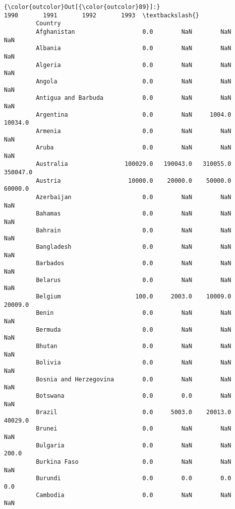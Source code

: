 \documentclass[11pt]{article}
\begin{document}
\begin{Verbatim}[commandchars=\\\{\}]
{\color{outcolor}Out[{\color{outcolor}89}]:}                              1990       1991       1992       1993  \textbackslash{}
         Country                                                              
         Afghanistan                   0.0        NaN        NaN        NaN   
         Albania                       0.0        NaN        NaN        NaN   
         Algeria                       0.0        NaN        NaN        NaN   
         Angola                        0.0        NaN        NaN        NaN   
         Antigua and Barbuda           0.0        NaN        NaN        NaN   
         Argentina                     0.0        NaN     1004.0    10034.0   
         Armenia                       0.0        NaN        NaN        NaN   
         Aruba                         0.0        NaN        NaN        NaN   
         Australia                100029.0   190043.0   310055.0   350047.0   
         Austria                   10000.0    20000.0    50000.0    60000.0   
         Azerbaijan                    0.0        NaN        NaN        NaN   
         Bahamas                       0.0        NaN        NaN        NaN   
         Bahrain                       0.0        NaN        NaN        NaN   
         Bangladesh                    0.0        NaN        NaN        NaN   
         Barbados                      0.0        NaN        NaN        NaN   
         Belarus                       0.0        NaN        NaN        NaN   
         Belgium                     100.0     2003.0    10009.0    20009.0   
         Benin                         0.0        NaN        NaN        NaN   
         Bermuda                       0.0        NaN        NaN        NaN   
         Bhutan                        0.0        NaN        NaN        NaN   
         Bolivia                       0.0        NaN        NaN        NaN   
         Bosnia and Herzegovina        0.0        NaN        NaN        NaN   
         Botswana                      0.0        0.0        NaN        NaN   
         Brazil                        0.0     5003.0    20013.0    40029.0   
         Brunei                        0.0        NaN        NaN        NaN   
         Bulgaria                      0.0        NaN        NaN      200.0   
         Burkina Faso                  0.0        NaN        NaN        NaN   
         Burundi                       0.0        0.0        0.0        0.0   
         Cambodia                      0.0        NaN        NaN        NaN   

\end{Verbatim}
\end{document}
